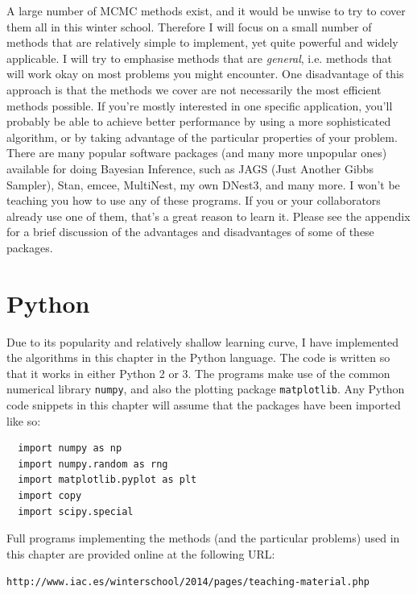 A large number of MCMC methods exist, and it would be
unwise to try to cover them all in this winter school. Therefore I will focus
on a small number of methods that are relatively simple to implement, yet quite powerful
and widely applicable. I will try to emphasise methods that are {\it general},
i.e. methods that will work okay on most problems you might encounter. One
disadvantage of this approach is that the methods we cover are not necessarily
the most efficient methods possible. If you're mostly interested in one
specific application, you'll probably be able to achieve better performance
by using a more sophisticated algorithm, or by taking advantage of the particular
properties of your problem.
There are many popular software packages (and many more unpopular ones)
available for doing Bayesian Inference, such as JAGS (Just Another Gibbs Sampler),
Stan, emcee, MultiNest, my own DNest3, and many more.
I won't be teaching you how to use any of these programs.
If you or your collaborators already use one of them, that's a great reason to
learn it. Please see the appendix for a brief discussion of the advantages and
disadvantages of some of these packages.


\section{Python}
Due to its popularity and relatively shallow learning curve,
I have implemented the algorithms in this chapter in the Python language.
The code is written so that it works in either Python 2 or 3.
The programs make use of the common numerical library {\tt numpy}, and also
the plotting package {\tt matplotlib}. Any Python code snippets in this chapter
will assume that the packages have been imported like so:

\begin{verbatim}
  import numpy as np
  import numpy.random as rng
  import matplotlib.pyplot as plt
  import copy
  import scipy.special
\end{verbatim}

Full programs implementing the methods (and the particular problems) used in
this chapter are provided online at the following URL:\\
\begin{center}
{\tt \small http://www.iac.es/winterschool/2014/pages/teaching-material.php}
\end{center}

